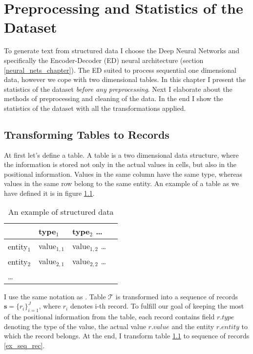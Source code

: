 \chapter{Preprocessing and Statistics of the Dataset} \label{chapter:preprocessing_and_statistics_of_the_dataset}

To generate text from structured data I choose the Deep Neural Networks and specifically the Encoder-Decoder (ED) neural architecture (section \ref{neural_nets_chapter}). The ED suited to process sequential one dimensional data, however we cope with two dimensional tables. In this chapter I present the statistics of the dataset \emph{before any preprocessing}. Next I elaborate about the methods of preprocessing and cleaning of the data. In the end I show the statistics of the dataset with all the transformations applied.

\section{Transforming Tables to Records} \label{table_to_record_trans}

At first let's define a table. A table is a two dimensional data structure, where the information is stored not only in the actual values in cells, but also in the positional information. Values in the same column have the same type, whereas values in the same row belong to the same entity. An example of a table as we have defined it is in figure \ref{ex_struct}.

\begin{table}[h]
    \centering
    \begin{tabular}{llll}
        \toprule
        {} & type$_1$ & type$_2$ \dots \\
        \midrule
        entity$_1$ & value$_{1,1}$ &  value$_{1,2}$ \dots \\
        entity$_2$ & value$_{2,1}$ & value$_{2,2}$ \dots \\
        \dots &&
    \end{tabular}
    \caption{An example of structured data} \label{ex_struct}
\end{table}

I use the same notation as \citep{liang-etal-2009-learning}. Table $\mathcal{T}$ is transformed into a sequence of records $ \mathbf{s} = \{ r_i \}_{i=1}^{J} $, where $r_i$ denotes i-th record. To fulfill our goal of keeping the most of the positional information from the table, each record contains field $r.type$ denoting the type of the value, the actual value $r.value$ and the entity $r.entity$ to which the record belongs. At the end, I transform table \ref{ex_struct} to sequence of records \ref{ex_seq_rec}.

